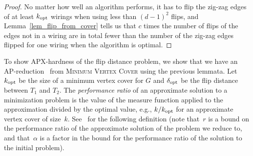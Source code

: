 \documentclass[11pt,a4paper]{article}
\begin{document}
\begin{proof}
No matter how well an algorithm performs, it has to flip the zig-zag edges of at least $k_{\mathrm{opt}}$ wirings when using less than $(d-1)^2$ flips, and Lemma~\ref{lem_flip_from_cover} tells us that $c$ times the number of flips of the edges not in a wiring are in total fewer than the number of the zig-zag edges flipped for one wiring when the algorithm is optimal.
\end{proof}




To show APX-hardness of the flip distance problem, we show that we have an AP-reduction~\cite[pp.~256--261]{apx_book} from \textsc{Minimum Vertex Cover} using the previous lemmata.
Let $k_{\mathrm{opt}}$ be the size of a minimum vertex cover for $G$ and $\delta_{\mathrm{opt}}$ be the flip distance between $T_1$ and $T_2$.
The \emph{performance ratio} of an approximate solution to a minimization problem is the value of the measure function applied to the approximation divided by the optimal value, e.g., $k/k_{\mathrm{opt}}$ for an approximate vertex cover of size~$k$.
See~\cite[pp.~257--258]{apx_book} for the following definition (note that~$r$ is a bound on the performance ratio of the approximate solution of the problem we reduce to, and that~$\alpha$ is a factor in the bound for the performance ratio of the solution to the initial problem).
\end{document}
